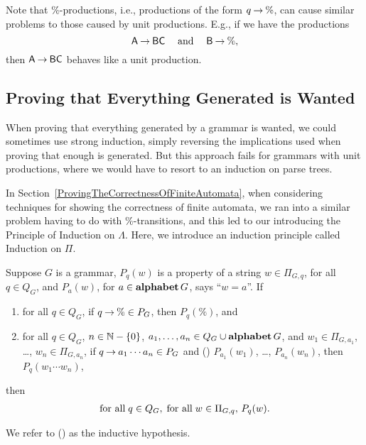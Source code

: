 Note that $\%$-productions, i.e., productions of the form $q\mathbin{\to}\%$,
can cause similar problems to those caused by unit productions.  E.g.,
if we have the productions
\begin{displaymath}
  \mathsf{A}\mathbin{\to} \mathsf{B}\mathsf{C} \quad\;\allowbreak\mbox{and}\allowbreak\;\quad \mathsf{B}\mathbin{\to}\% ,
\end{displaymath}
then $\mathsf{A}\mathbin{\to}\mathsf{B}\mathsf{C}$ behaves like a unit production.

\subsection{Proving that Everything Generated is Wanted}

When proving that everything generated by a grammar is wanted, we
could sometimes use strong induction, simply reversing the
implications used when proving that enough is generated.  But this
approach fails for grammars with unit productions, where we would have
to resort to an induction on parse trees.  

In Section~\ref{ProvingTheCorrectnessOfFiniteAutomata}, when
considering techniques for showing the correctness of finite automata,
we ran into a similar problem having to do with $\%$-transitions, and
this led to our introducing the Principle of Induction on $\Lambda$.
Here, we introduce an induction principle called Induction on $\Pi$.

%
\begin{theorem}
%
Suppose $G$ is a grammar, $P_q(w)$ is a property of a
string $w\in\Pi_{G,q}$, for all $q\in Q_G$, and
$P_a(w)$, for $a\in\mathbf{alphabet}\,G$, says ``$w=a$''.
If
\begin{enumerate}[\quad(1)]
\item for all $q\in Q_G$, if $q\mathbin{\to}\%\in P_G$, then $P_q(\%)$, and

\item for all $q\in Q_G$, $n\in\mathbb{N}-\{0\}$, $a_1,\ldots,a_n\in
  Q_G\cup\mathbf{alphabet}\,G$, and $w_1\in\Pi_{G,a_1}$, \ldots,
  $w_n\in\Pi_{G,a_n}$, if $q\mathbin{\to} a_1\cdots a_n\in P_G$ and (\dag)
  $P_{a_1}(w_1)$, \ldots, $P_{a_n}(w_n)$, then $P_q(w_1\cdots w_n)$,
\end{enumerate}
then
\begin{gather*}
  \allowbreak\mbox{for all}\allowbreak\;q\in Q_G, \;\allowbreak\mbox{for all}\allowbreak\;w\in\Pi_{G,q},\,P_q(w).
\end{gather*}
\end{theorem}
We refer to (\dag) as the inductive hypothesis.

